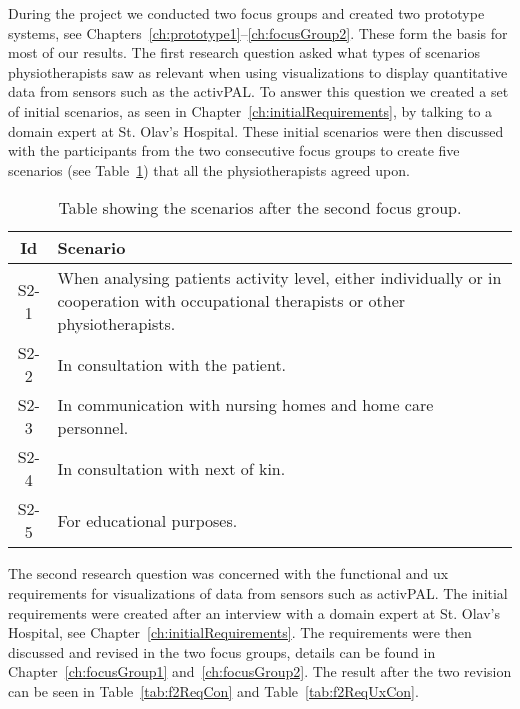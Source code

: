 During the project we conducted two focus groups and created two prototype systems, see Chapters~\ref{ch:prototype1}--\ref{ch:focusGroup2}. These form the basis for most of our results. The first research question asked what types of scenarios physiotherapists saw as relevant when using visualizations to display quantitative data from sensors such as the activPAL. To answer this question we created a set of initial scenarios, as seen in Chapter~\ref{ch:initialRequirements}, by talking to a domain expert at St. Olav's Hospital. These initial scenarios were then discussed with the participants from the two consecutive focus groups to create five scenarios (see Table~\ref{tab:finalScenarios}) that all the physiotherapists agreed upon.
\begin{table}[h!]
  \begin{tabular}{|c|p{10cm}|}
    \hline
    \textbf{Id} & \textbf{Scenario} \\ \hline
    S2-1 & When analysing patients activity level, either individually or in cooperation with occupational therapists or other physiotherapists. \\ \hline
    S2-2 & In consultation with the patient. \\ \hline
    S2-3 & In communication with nursing homes and home care personnel. \\ \hline
    S2-4 & In consultation with next of kin. \\ \hline
    S2-5 & For educational purposes. \\ \hline
  \end{tabular}
  \caption[Final scenarios]{Table showing the scenarios after the second focus group.}
  \label{tab:finalScenarios}
\end{table}

The second research question was concerned with the functional and \gls{ux} requirements for visualizations of data from sensors such as activPAL. The initial requirements were created after an interview with a domain expert at St. Olav's Hospital, see Chapter~\ref{ch:initialRequirements}. The requirements were then discussed and revised in the two focus groups, details can be found in Chapter~\ref{ch:focusGroup1} and~\ref{ch:focusGroup2}. The result after the two revision can be seen in Table~\ref{tab:f2ReqCon} and Table~\ref{tab:f2ReqUxCon}.

